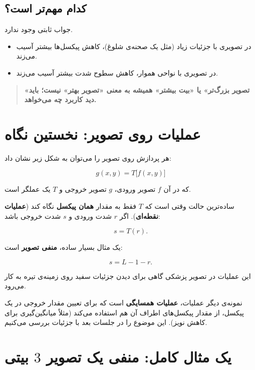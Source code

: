 \documentclass[11pt,a4paper]{article}
\begin{document}
	\subsection{کدام مهم‌تر است؟}
	
	جواب ثابتی وجود ندارد.
	
	\begin{itemize}
		\item در تصویری با جزئیات زیاد (مثل یک صحنه‌ی شلوغ)، کاهش پیکسل‌ها بیشتر آسیب می‌زند.
		\item در تصویری با نواحی هموار، کاهش سطوح شدت بیشتر آسیب می‌زند.
	\end{itemize}
	
	\begin{quote}
		\textbf{«تصویر بزرگ‌تر» یا «بیت بیشتر» همیشه به معنی «تصویر بهتر» نیست؛
			باید دید کاربرد چه می‌خواهد.}
	\end{quote}
	
	
	\section{عملیات روی تصویر: نخستین نگاه}
	
	هر پردازش روی تصویر را می‌توان به شکل زیر نشان داد:
	
	\[
	g(x,y)=T\big[f(x,y)\big]
	\]
	
	که در آن $f$ تصویر ورودی، $g$ تصویر خروجی و $T$ یک عملگر است.
	
	ساده‌ترین حالت وقتی است که $T$ فقط به مقدار \textbf{همان پیکسل} نگاه کند
	(\textbf{عملیات نقطه‌ای}). اگر $r$ شدت ورودی و $s$ شدت خروجی باشد:
	
	\[
	s=T(r).
	\]
	
	یک مثال بسیار ساده، \textbf{منفی تصویر} است:
	
	\[
	s=L-1-r.
	\]
	
	این عملیات در تصویر پزشکی گاهی برای دیدن جزئیات سفید روی زمینه‌ی تیره به کار می‌رود.
	
	نمونه‌ی دیگر عملیات، \textbf{عملیات همسایگی} است که برای تعیین مقدار خروجی در یک پیکسل،
	از مقدار پیکسل‌های اطراف آن هم استفاده می‌کند (مثلاً میانگین‌گیری برای کاهش نویز).
	این موضوع را در جلسات بعد با جزئیات بررسی می‌کنیم.
	
	
	\section{یک مثال کامل: منفی یک تصویر $3$ بیتی}
	
\end{document}

